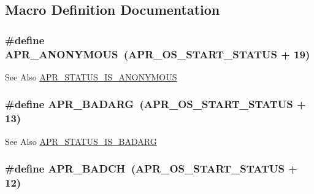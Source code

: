 \subsection{Macro Definition Documentation}
\hypertarget{group___a_p_r___error_ga738a229b0c27bd96ae0173fecab251b7}{
\subsubsection[{A\-P\-R\-\_\-\-A\-N\-O\-N\-Y\-M\-O\-U\-S}]{\setlength{\rightskip}{0pt plus 5cm}\#define A\-P\-R\-\_\-\-A\-N\-O\-N\-Y\-M\-O\-U\-S~({\bf A\-P\-R\-\_\-\-O\-S\-\_\-\-S\-T\-A\-R\-T\-\_\-\-S\-T\-A\-T\-U\-S} + 19)}}\label{group___a_p_r___error_ga738a229b0c27bd96ae0173fecab251b7}
\begin{DoxySeeAlso}{See Also}
\hyperlink{group___a_p_r___s_t_a_t_u_s___i_s_gabf2969f69ac131cb06178c0809abf943}{A\-P\-R\-\_\-\-S\-T\-A\-T\-U\-S\-\_\-\-I\-S\-\_\-\-A\-N\-O\-N\-Y\-M\-O\-U\-S} 
\end{DoxySeeAlso}
\hypertarget{group___a_p_r___error_ga771bf48ab38d93355be8530f6efe4ae9}{
\subsubsection[{A\-P\-R\-\_\-\-B\-A\-D\-A\-R\-G}]{\setlength{\rightskip}{0pt plus 5cm}\#define A\-P\-R\-\_\-\-B\-A\-D\-A\-R\-G~({\bf A\-P\-R\-\_\-\-O\-S\-\_\-\-S\-T\-A\-R\-T\-\_\-\-S\-T\-A\-T\-U\-S} + 13)}}\label{group___a_p_r___error_ga771bf48ab38d93355be8530f6efe4ae9}
\begin{DoxySeeAlso}{See Also}
\hyperlink{group___a_p_r___s_t_a_t_u_s___i_s_ga88b31c127ad48d12353d175926913cb3}{A\-P\-R\-\_\-\-S\-T\-A\-T\-U\-S\-\_\-\-I\-S\-\_\-\-B\-A\-D\-A\-R\-G} 
\end{DoxySeeAlso}
\hypertarget{group___a_p_r___error_ga6f3ca71069880d9fe5678687a257d616}{
\subsubsection[{A\-P\-R\-\_\-\-B\-A\-D\-C\-H}]{\setlength{\rightskip}{0pt plus 5cm}\#define A\-P\-R\-\_\-\-B\-A\-D\-C\-H~({\bf A\-P\-R\-\_\-\-O\-S\-\_\-\-S\-T\-A\-R\-T\-\_\-\-S\-T\-A\-T\-U\-S} + 12)}}\label{group___a_p_r___error_ga6f3ca71069880d9fe5678687a257d616}
